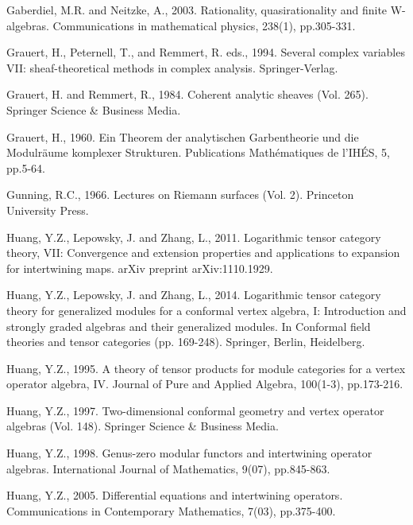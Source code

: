 \documentclass[12pt,a4paper,notitlepage]{article}
\theoremstyle{definition}
\theoremstyle{plain}
\numberwithin{equation}{section}
\begin{document}
\begin{thebibliography}{999999}
		

Gaberdiel, M.R. and Neitzke, A., 2003. Rationality, quasirationality and finite W-algebras. Communications in mathematical physics, 238(1), pp.305-331.
		
		Grauert, H., Peternell, T., and Remmert, R. eds., 1994. Several complex variables VII: sheaf-theoretical methods in complex analysis. Springer-Verlag.
		
		Grauert, H. and Remmert, R., 1984. Coherent analytic sheaves (Vol. 265). Springer Science \& Business Media.
		
		Grauert, H., 1960. Ein Theorem der analytischen Garbentheorie und die Modulr\"aume komplexer Strukturen. Publications Math\'ematiques de l'IH\'ES, 5, pp.5-64.
		
Gunning, R.C., 1966. Lectures on Riemann surfaces (Vol. 2). Princeton University Press.

Huang, Y.Z., Lepowsky, J. and Zhang, L., 2011. Logarithmic tensor category theory, VII: Convergence and extension properties and applications to expansion for intertwining maps. arXiv preprint arXiv:1110.1929.

Huang, Y.Z., Lepowsky, J. and Zhang, L., 2014. Logarithmic tensor category theory for generalized modules for a conformal vertex algebra, I: Introduction and strongly graded algebras and their generalized modules. In Conformal field theories and tensor categories (pp. 169-248). Springer, Berlin, Heidelberg.
	
Huang, Y.Z., 1995. A theory of tensor products for module categories for a vertex operator algebra, IV. Journal of Pure and Applied Algebra, 100(1-3), pp.173-216.	

		
		Huang, Y.Z., 1997. Two-dimensional conformal geometry and vertex operator algebras (Vol. 148). Springer Science \& Business Media.
		

Huang, Y.Z., 1998. Genus-zero modular functors and intertwining operator algebras. International Journal of Mathematics, 9(07), pp.845-863.		
		
Huang, Y.Z., 2005. Differential equations and intertwining operators. Communications in Contemporary Mathematics, 7(03), pp.375-400.


\end{thebibliography}
\end{document}
